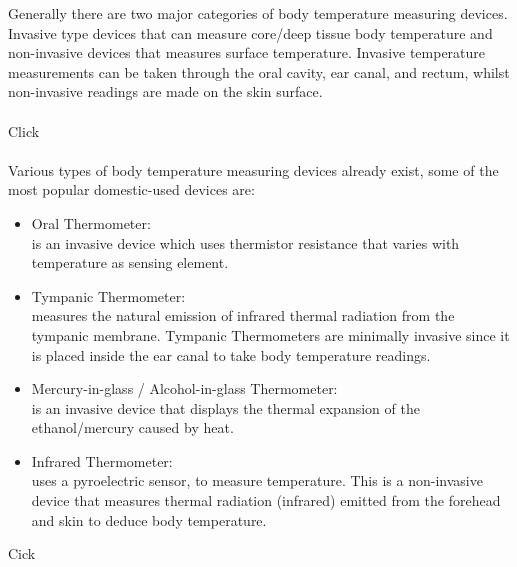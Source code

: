 \documentclass[a4paper, 12pt]{report}
\begin{document}
	Generally there are two major categories of body temperature measuring devices. Invasive type devices that can measure core/deep tissue body temperature and non-invasive devices that measures surface temperature. Invasive temperature measurements can be taken through the oral cavity, ear canal, and rectum, whilst non-invasive readings are made on
	the skin surface.
	\\\\
	Click
	\\\\
	Various types of body temperature measuring devices already exist, some of the most popular domestic-used devices are:
	\begin{itemize}
		\item Oral Thermometer:\\is an invasive device which uses thermistor resistance that varies with temperature as sensing element.
		\item Tympanic Thermometer:\\measures the natural emission of infrared thermal radiation from the tympanic membrane. Tympanic Thermometers are minimally invasive since it is placed inside the ear canal to take body temperature readings.
		\item Mercury-in-glass / Alcohol-in-glass Thermometer:\\is an invasive device that displays the thermal expansion of the ethanol/mercury caused by heat. 
		\item Infrared Thermometer:\\uses a pyroelectric sensor, to measure temperature. This is a non-invasive device that measures thermal radiation (infrared) emitted from the forehead and skin to deduce body temperature.
	\end{itemize}	
	  
	Cick
	\\\\
	
\end{document}
